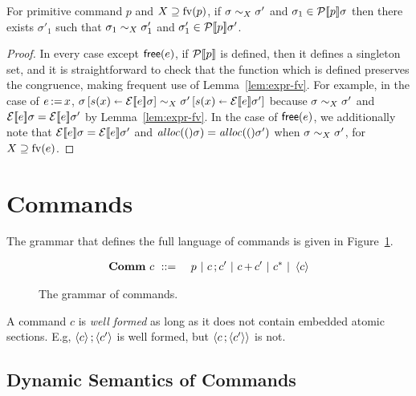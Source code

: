 \documentclass[11pt]{report}
\begin{document}
\begin{lemma}\label{lem:pcomm-fv-step}
	For primitive command $p$ and $X \supseteq \mathrm{fv}(p)$, if $\sigma \sim_{X} \sigma'$ and $\sigma_1 \in \mathcal{P}[\![p]\!]\sigma$ then there exists $\sigma'_1$  such that $\sigma_1 \sim_{X} \sigma_1'$ and $\sigma'_1 \in \mathcal{P}[\![p]\!]\sigma'$.
\end{lemma}

\begin{proof}
	In every case except $\operatorname{\mathsf{free}}(e)$, if $\mathcal{P}[\![p]\!]$ is defined, then it defines a singleton set, and it is straightforward to check that the function which is defined preserves the congruence, making frequent use of Lemma~\ref{lem:expr-fv}. For example, in the case of $e \operatorname{:\!=} x$, $\sigma \left[ s(x) \shortleftarrow \mathcal{E}[\![e]\!]\sigma \right] \sim_{X} \sigma' \left[ s(x) \shortleftarrow \mathcal{E}[\![e]\!]\sigma' \right]$ because $\sigma \sim_{X} \sigma'$ and $\mathcal{E}[\![e]\!]\sigma = \mathcal{E}[\![e]\!]\sigma'$ by Lemma~\ref{lem:expr-fv}. In the case of $\operatorname{\mathsf{free}}(e)$, we additionally note that $\mathcal{E}[\![e]\!]\sigma = \mathcal{E}[\![e]\!]\sigma'$ and $\mathit{alloc}(()\sigma) =\mathit{alloc}(()\sigma')$ when $\sigma \sim_{X} \sigma'$, for $X \supseteq \mathrm{fv}(e)$. 
\end{proof}




\section{Commands} %
\label{sec:commands}

The grammar that defines the full language of commands is given in Figure~\ref{fig:commands}. 

\begin{figure}[h]
	\centering
		\begin{eqnarray*}
			\mathbf{Comm}~c & ~::=~ & p ~|~ c \operatorname{;} c' ~|~ c \operatorname{+} c' ~|~ c^{\operatorname{\ast}} ~|~ \left\langle c \right\rangle
		\end{eqnarray*}
	\caption{The grammar of commands.}
	\label{fig:commands}
\end{figure}

A command $c$ is \emph{well formed} as long as it does not contain embedded atomic sections. E.g, $\left\langle c \right\rangle \operatorname{;} \left\langle c' \right\rangle$ is well formed, but $\left\langle c \operatorname{;} \left\langle c' \right\rangle \right\rangle$ is not. 

\subsection{Dynamic Semantics of Commands} %
\label{sub:dynamic_semantics}
\end{document}

